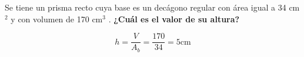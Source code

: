 \question[10] Se tiene un prisma recto cuya base es un decágono regular con área igual a 34 cm$^2$ y con volumen de 170 cm$^3$ . \textbf{¿Cuál es el valor de su altura?}

\begin{solutionbox}{2cm}
    \[h=\dfrac{V}{A_b}=\dfrac{170}{34}=5 \text{cm}\]
\end{solutionbox}